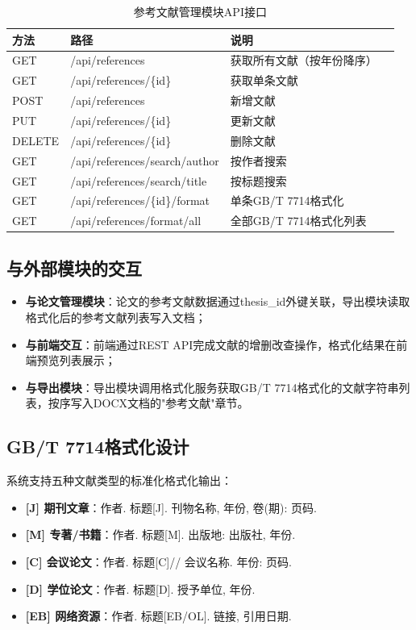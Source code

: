 \documentclass{../softeng}
\begin{document}
\begin{table}[htbp]
\centering
\caption{参考文献管理模块API接口}
\label{tab:ref_api}
\begin{tabular}{lllp{5cm}}
\toprule
\textbf{方法} & \textbf{路径} & \textbf{说明} \\
\midrule
GET    & /api/references       & 获取所有文献（按年份降序） \\
GET    & /api/references/\{id\} & 获取单条文献 \\
POST   & /api/references       & 新增文献 \\
PUT    & /api/references/\{id\} & 更新文献 \\
DELETE & /api/references/\{id\} & 删除文献 \\
GET    & /api/references/search/author & 按作者搜索 \\
GET    & /api/references/search/title  & 按标题搜索 \\
GET    & /api/references/\{id\}/format & 单条GB/T 7714格式化 \\
GET    & /api/references/format/all   & 全部GB/T 7714格式化列表 \\
\bottomrule
\end{tabular}
\end{table}

\subsection{与外部模块的交互}

\begin{itemize}
    \item \textbf{与论文管理模块}：论文的参考文献数据通过thesis\_id外键关联，导出模块读取格式化后的参考文献列表写入文档；
    \item \textbf{与前端交互}：前端通过REST API完成文献的增删改查操作，格式化结果在前端预览列表展示；
    \item \textbf{与导出模块}：导出模块调用格式化服务获取GB/T 7714格式化的文献字符串列表，按序写入DOCX文档的"参考文献"章节。
\end{itemize}

\subsection{GB/T 7714格式化设计}

系统支持五种文献类型的标准化格式化输出：

\begin{itemize}
    \item \textbf{[J] 期刊文章}：作者. 标题[J]. 刊物名称, 年份, 卷(期): 页码.
    \item \textbf{[M] 专著/书籍}：作者. 标题[M]. 出版地: 出版社, 年份.
    \item \textbf{[C] 会议论文}：作者. 标题[C]// 会议名称. 年份: 页码.
    \item \textbf{[D] 学位论文}：作者. 标题[D]. 授予单位, 年份.
    \item \textbf{[EB] 网络资源}：作者. 标题[EB/OL]. 链接, 引用日期.
\end{itemize}
\end{document}
